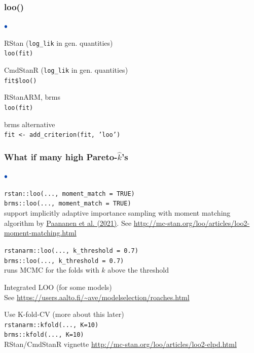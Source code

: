 \documentclass[english,t]{beamer}
\newenvironment{list1}{
   \begin{list}{$\color{list1}\bullet$}{\itemsep=6pt}}{
  \end{list}}
\begin{document}
\begin{frame}[fragile]
  \frametitle{loo()}

  \begin{list1}
  \item<+-> RStan (\texttt{log\_lik} in gen. quantities)\\
    \texttt{loo(fit)}
  \item<+-> CmdStanR (\texttt{log\_lik} in gen. quantities)\\
    \texttt{fit\$loo()}
  \item<+-> RStanARM, brms\\
    \texttt{loo(fit)}
  \item<+-> brms alternative\\
    \texttt{fit <- add\_criterion(fit, 'loo')}
  \end{list1}
  
\end{frame}

\begin{frame}[fragile]
  \frametitle{What if many high Pareto-$\hat{k}$'s}

  \begin{list1}
  \item<+-> \texttt{rstan::loo(..., moment\_match = TRUE)}\\
    \texttt{brms::loo(..., moment\_match = TRUE)}\\
    support implicitly adaptive importance sampling with moment
    matching algorithm by
    \href{https://doi.org/10.1007/s11222-020-09982-2}{Paananen et al. (2021)}.  See \url{http://mc-stan.org/loo/articles/loo2-moment-matching.html}
  \item<+-> \texttt{rstanarm::loo(..., k\_threshold = 0.7)}\\
    \texttt{brms::loo(..., k\_threshold = 0.7)}\\
    runs MCMC for the folds with $\hat{k}$ above the threshold
  \item<+-> Integrated LOO (for some models)\\
    See \url{https://users.aalto.fi/~ave/modelselection/roaches.html}
  \item<+-> Use K-fold-CV (more about this later)\\
    \texttt{rstanarm::kfold(..., K=10)}\\
    \texttt{brms::kfold(..., K=10)}\\
    RStan/CmdStanR vignette \url{http://mc-stan.org/loo/articles/loo2-elpd.html}
  \end{list1}
  
\end{frame}
\end{document}
